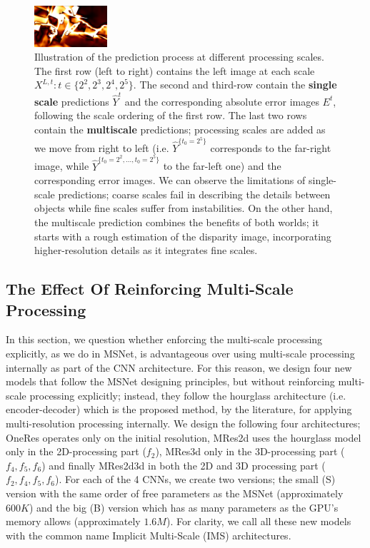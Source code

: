 \documentclass[runningheads]{llncs}
\begin{document}
\begin{figure}
\begin{center}
        \includegraphics[width=0.24\textwidth,height=0.08\textwidth,clip]{figures/pred_comb_3_err.png}
    \end{center}
    \caption{Illustration of the prediction process at different processing scales. The first row (left to right) contains the left image at each scale $X^{L,t} : t \in \{2^2, 2^3, 2^4, 2^5\}$. The second and third-row contain the \textbf{single scale} predictions $\hat{Y}^{t}$ and the corresponding absolute error images $E^{t}$, following the scale ordering of the first row. The last two rows contain the \textbf{multiscale} predictions;  processing scales are added as we move from right to left (i.e. $\hat{Y}^{\{t_0= 2^5\}}$ corresponds to the far-right image, while $\hat{Y}^{\{t_0=2^2, ..., t_0=2^5\}}$ to the far-left one) and the corresponding error images. We can observe the limitations of single-scale predictions; coarse scales fail in describing the details between objects while fine scales suffer from instabilities. On the other hand, the multiscale prediction combines the benefits of both worlds; it starts with a rough estimation of the disparity image, incorporating higher-resolution details as it integrates fine scales.}
    \label{fig:EMAPs}
\end{figure}

\subsection{The Effect Of Reinforcing Multi-Scale Processing}

In this section, we question whether enforcing the multi-scale processing explicitly, as we do in MSNet, is advantageous over using multi-scale processing internally as part of the CNN architecture. For this reason, we design four new models that follow the MSNet designing principles, but without reinforcing multi-scale processing explicitly; instead, they follow the hourglass architecture (i.e. encoder-decoder) which is the proposed method, by the literature, for applying multi-resolution processing internally. We design the following four architectures; OneRes operates only on the initial resolution, MRes2d uses the hourglass model only in the 2D-processing part ($f_2$), MRes3d only in the 3D-processing part ($f_4, f_5, f_6$) and finally MRes2d3d in both the 2D and 3D processing part ($f_2, f_4, f_5, f_6$). For each of the 4 CNNs, we create two versions; the small (S) version with the same order of free parameters as the MSNet (approximately $600K$) and the big (B) version which has as many parameters as the GPU's memory allows (approximately $1.6M$). For clarity, we call all these new models with the common name Implicit Multi-Scale (IMS) architectures.
\end{document}
